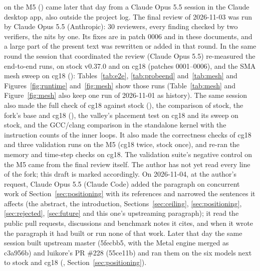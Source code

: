 on the M5 () came later that day from a Claude Opus 5.5 session in the Claude desktop
app, also outside the project log.
The final review of 2026-11-03 was run by Claude Opus 5.5 (Anthropic): 30 reviewers, every finding checked by two
verifiers, the nits by one. Its fixes are in patch 0006 and in these documents, and a large part of the present text
was rewritten or added in that round. In the same round the session that coordinated the review (Claude Opus 5.5)
re-measured the end-to-end runs, on stock v0.37.0 and on cg18 (patches 0001--0006), and the SMA mesh sweep on cg18
(): Tables~\ref{tab:e2e},
\ref{tab:probeend} and~\ref{tab:mesh} and Figures~\ref{fig:runtime} and~\ref{fig:mesh} show those runs
(Table~\ref{tab:mesh} and Figure~\ref{fig:mesh} also keep one run of 2026-11-01 as history). The same session also
made the full check of cg18 against stock (), the comparison of stock, the fork's base and
cg18 (), the valley's placement test on cg18 and its sweep on stock, and the GCC/clang comparison in
the standalone kernel with the instruction counts of the inner loops. It also made the correctness checks of cg18 and
three validation runs on the M5 (cg18 twice, stock once), and re-ran the memory and time-step checks on cg18. The
validation suite's negative control on the
M5 came from the final review itself. The author has not yet read every line of the fork; this draft is marked
accordingly.
On 2026-11-04, at the author's request, Claude Opus 5.5 (Claude Code) added the paragraph on concurrent work of
Section~\ref{sec:positioning} with its references and narrowed the sentences it affects (the abstract, the
introduction, Sections~\ref{sec:ceiling}, \ref{sec:positioning}, \ref{sec:rejected}, \ref{sec:future} and this
one's upstreaming paragraph); it read the public pull requests, discussions and benchmark notes it cites, and when it
wrote the paragraph it had built or run none of that work. Later that day the same session built upstream master
(5fecbb5, with the Metal engine merged as c3a956b) and luikore's PR \#228 (55ce11b) and ran them on the six models next
to stock and cg18 (, Section~\ref{sec:positioning}).

